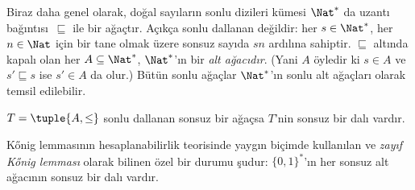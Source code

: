 \documentclass[../../../include/open-logic-section]{subfiles}
\begin{document}
\begin{ex}
Biraz daha genel olarak, doğal sayıların sonlu dizileri kümesi $\Nat^*$ da
uzantı bağıntısı~$\sqsubseteq$ ile bir ağaçtır. Açıkça sonlu dallanan değildir:
her $s \in \Nat^*$, her $n \in \Nat$ için bir tane olmak üzere sonsuz sayıda
$sn$ ardılına sahiptir. $\sqsubseteq$ altında kapalı olan her
$A \subseteq \Nat^*$, $\Nat^*$'ın bir \emph{alt ağacıdır}. (Yani $A$ öyledir
ki $s \in A$ ve $s' \sqsubseteq s$ ise $s' \in A$ da olur.) Bütün sonlu
ağaçlar $\Nat^*$'ın sonlu alt ağaçları olarak temsil edilebilir.
\end{ex}

\begin{prop}
$T=\tuple{A,\le}$ sonlu dallanan sonsuz bir ağaçsa $T$'nin sonsuz bir dalı
vardır.
\end{prop}

K\H{o}nig lemmasının hesaplanabilirlik teorisinde yaygın biçimde kullanılan ve
\emph{zayıf K\H{o}nig lemması} olarak bilinen özel bir durumu şudur:
$\{0,1\}^*$'ın her sonsuz alt ağacının sonsuz bir dalı vardır.
\end{document}
